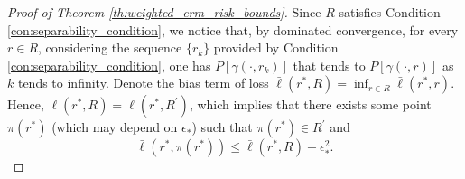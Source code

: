 \documentclass[letterpaper]{article} %
\newcommand{\Pro}{P}
\newcommand{\relossf}{\bar{\ell}}
\begin{document}
\begin{proof}[Proof of Theorem \ref{th:weighted_erm_risk_bounds}] %
    Since $R$ satisfies Condition \ref{con:separability_condition}, we notice that, by dominated convergence, for every $r\in R$, considering the sequence $\{r_k\}$ provided by Condition \ref{con:separability_condition}, one has $\Pro[\gamma(\cdot,r_k)]$ that tends to $\Pro[\gamma(\cdot, r)]$ as $k$ tends to infinity. Denote the bias term of loss $\relossf(r^*,R)=\inf_{r\in R}\relossf(r^*,r)$. Hence, $\relossf(r^*,R)=\relossf(r^*,R^\prime)$, which implies that there exists some point $\pi(r^*)$ (which may depend on $\epsilon_*$) such that $\pi(r^*)\in R^\prime$ and
    \begin{equation}
        \label{eq:asymptotic_function_inequality}
        \relossf(r^*, \pi(r^*))\le \relossf(r^*,R)+\epsilon_*^2.
    \end{equation}


\end{proof}
\end{document}
